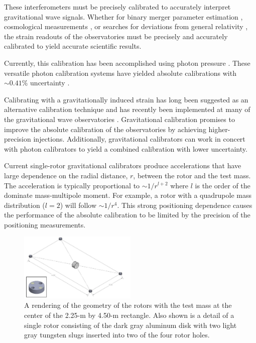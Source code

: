 \documentclass[superscriptaddress, twocolumn, prd]{revtex4-1}
\begin{document}
These interferometers must be precisely calibrated to accurately interpret gravitational wave signals. Whether for binary merger parameter estimation \cite{abbott2020population}, cosmological measurements \cite{abbott2021gravitational, ligo2017gravitational, schutz1986determining}, or searches for deviations from general relativity \cite{abbott2020tests}, the strain readouts of the observatories must be precisely and accurately calibrated to yield accurate scientific results.

Currently, this calibration has been accomplished using photon pressure \cite{PCal}. These versatile photon calibration systems have yielded absolute calibrations with $\sim0.41\%$ uncertainty \cite{Bhattacharjee_2020}. 

Calibrating with a gravitationally induced strain has long been suggested as an alternative calibration technique \cite{hirakawa1980dynamical, kuroda1985experimental, mio1987experimental, astone1991evaluation, astone1998experimental, Matone_2007} and has recently been implemented at many of the gravitational wave observatories \cite{Estevez_2018, estevez2021newtonian, PhysRevD.98.022005, ncal}. Gravitational calibration  promises to improve the absolute calibration of the observatories by achieving higher-precision injections. Additionally, gravitational calibrators can work in concert with photon calibrators to yield a combined calibration with lower uncertainty.

Current single-rotor gravitational calibrators \cite{Estevez_2018, estevez2021newtonian, PhysRevD.98.022005, ncal} produce accelerations that have large dependence on the radial distance, $r$, between the rotor and the test mass. The acceleration is typically proportional to $\sim1/r^{l+2}$ where $l$ is the order of the dominate mass-multipole moment. For example, a rotor with a quadrupole mass distribution ($l=2$) will follow $\sim1/r^4$. This strong positioning dependence causes the performance of the absolute calibration to be limited by the precision of the positioning measurements. 

\begin{figure}[!h]
\centering \includegraphics[width=0.5\textwidth]{Super4_Model.pdf}
\caption{A rendering of the geometry of the rotors with the test mass at the center of the 2.25-m by 4.50-m rectangle. Also shown is a detail of a single rotor consisting of the dark gray aluminum disk with two light gray tungsten slugs inserted into two of the four rotor holes.}
\label{cad} 
\end{figure}
\end{document}
